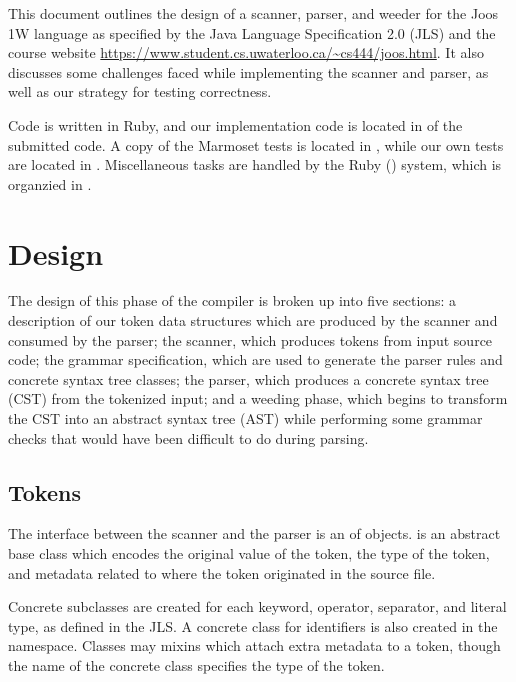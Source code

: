 \documentclass[pdftex,11pt,a4paper]{article}
\begin{document}

This document outlines the design of a scanner, parser, and weeder for
the Joos 1W language as specified by the Java Language Specification
2.0 (JLS) and the course website
\url{https://www.student.cs.uwaterloo.ca/~cs444/joos.html}. It also
discusses some challenges faced while implementing the scanner and
parser, as well as our strategy for testing correctness.

Code is written in Ruby, and our implementation code is located in
 of the submitted code. A copy of the Marmoset tests is
located in , while our own tests are located in
. Miscellaneous tasks are handled by the Ruby 
() system, which is organzied in .


\section{Design}

The design of this phase of the compiler is broken up into five
sections: a description of our token data structures which are
produced by the scanner and consumed by the parser; the scanner, which
produces tokens from input source code; the grammar specification,
which are used to generate the parser rules and concrete syntax tree
classes; the parser, which produces a concrete syntax tree (CST) from
the tokenized input; and a weeding phase, which begins to transform
the CST into an abstract syntax tree (AST) while performing some
grammar checks that would have been difficult to do during parsing.


\subsection{Tokens}

The interface between the scanner and the parser is an  of
 objects.  is an abstract base class
which encodes the original value of the token, the type of the token,
and metadata related to where the token originated in the source file.

Concrete subclasses are created for each keyword, operator, separator,
and literal type, as defined in the JLS. A concrete class for
identifiers is also created in the 
namespace. Classes may  mixins which attach extra
metadata to a token, though the name of the concrete class specifies
the type of the token.
\end{document}
